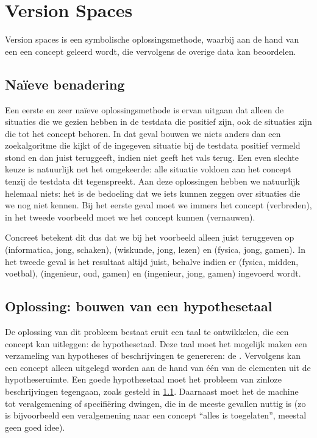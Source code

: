 \section{Version Spaces}
Version spaces is een symbolische oplossingsmethode, waarbij aan de hand van een  een concept geleerd wordt, die vervolgens de overige data kan beoordelen.
\subsection{Na\"ieve benadering}
\label{sss:versionSpacesNaif}
Een eerste en zeer na\"ieve oplossingsmethode is ervan uitgaan dat alleen de situaties die we gezien hebben in de testdata die positief zijn, ook de situaties zijn die tot het concept behoren. In dat geval bouwen we niets anders dan een zoekalgoritme die kijkt of de ingegeven situatie bij de testdata positief vermeld stond en dan juist teruggeeft, indien niet geeft het vals terug. Een even slechte keuze is natuurlijk net het omgekeerde: alle situatie voldoen aan het concept tenzij de testdata dit tegenspreekt. Aan deze oplossingen hebben we natuurlijk helemaal niets: het is de bedoeling dat we iets kunnen zeggen over situaties die we nog niet kennen. Bij het eerste geval moet we immers het concept  (verbreden), in het tweede voorbeeld moet we het concept kunnen  (vernauwen).
\begin{leftbar}
Concreet betekent dit dus dat we bij het voorbeeld alleen juist teruggeven op (informatica, jong, schaken), (wiskunde, jong, lezen) en (fysica, jong, gamen). In het tweede geval is het resultaat altijd juist, behalve indien er (fysica, midden, voetbal), (ingenieur, oud, gamen) en (ingenieur, jong, gamen) ingevoerd wordt. 
\end{leftbar}
\subsection{Oplossing: bouwen van een hypothesetaal}
De oplossing van dit probleem bestaat eruit een taal te ontwikkelen, die een concept kan uitleggen: de hypothesetaal. Deze taal moet het mogelijk maken een verzameling van hypotheses of beschrijvingen te genereren: de . Vervolgens kan een concept alleen uitgelegd worden aan de hand van \'e\'en van de elementen uit de hypotheseruimte. Een goede hypothesetaal moet het probleem van zinloze beschrijvingen tegengaan, zoals gesteld in \ref{sss:versionSpacesNaif}. Daarnaast moet het de machine tot veralgemening of specifi\"ering dwingen, die in de meeste gevallen nuttig is (zo is bijvoorbeeld een veralgemening naar een concept ``alles is toegelaten'', meestal geen goed idee).
